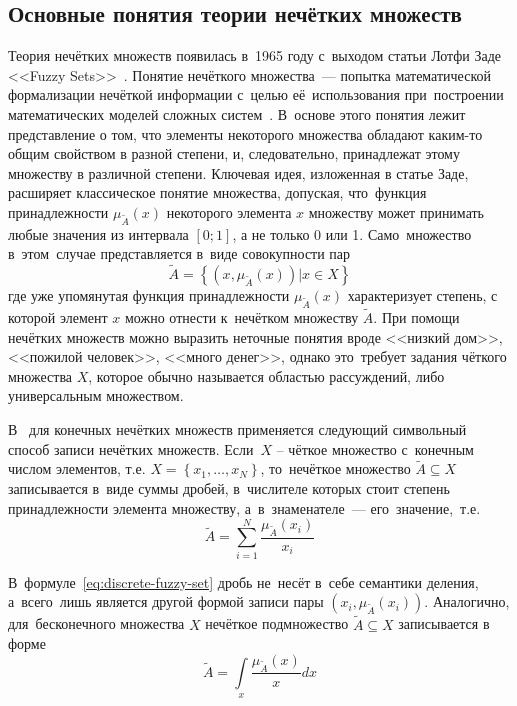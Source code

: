 \subsection{Основные понятия теории нечётких множеств}
Теория нечётких множеств появилась в~1965 году с~выходом статьи Лотфи Заде <<Fuzzy Sets>>~\cite{Zadeh_Classic}. Понятие нечёткого множества~--- попытка математической формализации нечёткой информации с~целью её~использования при~построении математических моделей сложных систем~\cite{Orlovskiy}. В~основе этого понятия лежит представление о том, что элементы некоторого множества обладают каким-то общим свойством в разной степени, и, следовательно, принадлежат этому множеству в различной степени. Ключевая идея, изложенная в статье Заде, расширяет классическое понятие множества, допуская, что~функция принадлежности $\mu_{\tilde A}\left( x \right)$ некоторого элемента $x$ множеству может принимать любые значения из интервала $\left[ 0;1 \right]$, а не только 0 или 1. Само~множество в~этом~случае представляется в~виде совокупности пар
\begin{equation}
	\tilde{A}=\left\{ \left( x, \mu_{\tilde A}\left( x \right) \right)\left| x\in X \right. \right\} 
\end{equation}
где уже упомянутая функция принадлежности $\mu_{\tilde A} \left( x \right)$ характеризует степень, с которой элемент $x$ можно отнести к~нечётком множеству $\tilde{A}$. При помощи нечётких множеств можно выразить неточные понятия вроде <<низкий дом>>, <<пожилой человек>>, <<много денег>>, однако это~требует задания чёткого множества $X$, которое обычно называется областью рассуждений, либо универсальным множеством.

В~\cite{Rutkovskaya, Borisov_Krumberg_Riga} для конечных нечётких множеств применяется следующий символьный способ записи нечётких множеств. Если~$X$ – чёткое множество с~конечным числом элементов, т.е. $X=\left\{x_1, \dots, x_N \right\}$, то~нечёткое множество $\tilde{A}\subseteq X$  записывается в~виде суммы дробей, в~числителе которых стоит степень принадлежности элемента множеству, а~в~знаменателе~--- его~значение,~т.е.
\begin{equation}
\label{eq:discrete-fuzzy-set}
	\tilde{A}=\sum\limits_{i=1}^{N} \frac{\mu_{\tilde A} \left( x_i \right)}{x_i}
\end{equation}

В~формуле~\eqref{eq:discrete-fuzzy-set} дробь не~несёт в~себе семантики деления, а~всего~лишь является другой формой записи пары $\left( {{x}_{i}},{{\mu }_{{\tilde{A}}}}\left( {{x}_{i}} \right) \right)$. Аналогично, для~бесконечного множества $X$ нечёткое подмножество $\tilde{A}\subseteq X$ записывается в форме
\begin{equation}
\label{eq:infinite-fuzzy-set}
	\tilde{A}=\int\limits_{x}{\frac{{{\mu }_{{\tilde{A}}}}\left( x \right)}{x}dx}
\end{equation}

